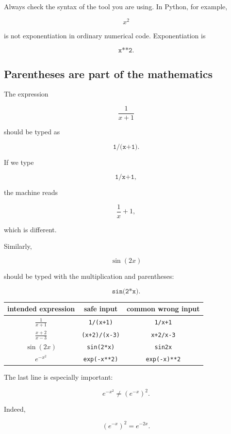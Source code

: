 Always check the syntax of the tool you are using.  In Python, for example,

\[
x^2
\]

is not exponentiation in ordinary numerical code.  Exponentiation is

\[
\texttt{x**2}.
\]

\subsection{Parentheses are part of the mathematics}
\label{appsubsec:parentheses-syntax}

The expression

\[
\frac{1}{x+1}
\]

should be typed as

\[
\texttt{1/(x+1)}.
\]

If we type

\[
\texttt{1/x+1},
\]

the machine reads

\[
\frac1x+1,
\]

which is different.

Similarly,

\[
\sin(2x)
\]

should be typed with the multiplication and parentheses:

\[
\texttt{sin(2*x)}.
\]

\begin{center}
\renewcommand{\arraystretch}{1.6}
\begin{tabular}{c|c|c}
\textbf{intended expression} & \textbf{safe input} & \textbf{common wrong input} \\ \hline
\(\displaystyle \frac{1}{x+1}\) &
\texttt{1/(x+1)} &
\texttt{1/x+1} \\

\(\displaystyle \frac{x+2}{x-3}\) &
\texttt{(x+2)/(x-3)} &
\texttt{x+2/x-3} \\

\(\sin(2x)\) &
\texttt{sin(2*x)} &
\texttt{sin2x} \\

\(e^{-x^2}\) &
\texttt{exp(-x**2)} &
\texttt{exp(-x)**2}
\end{tabular}
\end{center}

The last line is especially important:

\[
e^{-x^2}
\neq
(e^{-x})^2.
\]

Indeed,

\[
(e^{-x})^2=e^{-2x}.
\]

